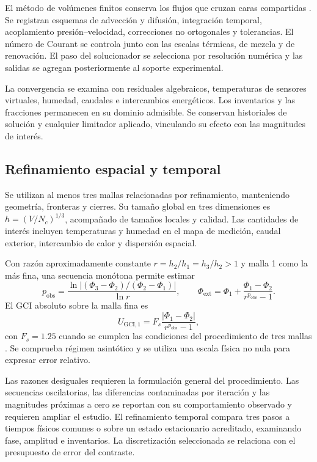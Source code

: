 El método de volúmenes finitos conserva los flujos que cruzan caras compartidas \cite{patankar1980,versteeg2007}. Se registran esquemas de advección y difusión, integración temporal, acoplamiento presión--velocidad, correcciones no ortogonales y tolerancias. El número de Courant se controla junto con las escalas térmicas, de mezcla y de renovación. El paso del solucionador se selecciona por resolución numérica y las salidas se agregan posteriormente al soporte experimental.

La convergencia se examina con residuales algebraicos, temperaturas de sensores virtuales, humedad, caudales e intercambios energéticos. Los inventarios y las fracciones permanecen en su dominio admisible. Se conservan historiales de solución y cualquier limitador aplicado, vinculando su efecto con las magnitudes de interés.

\subsection{Refinamiento espacial y temporal}
\label{met:refinamiento}

Se utilizan al menos tres mallas relacionadas por refinamiento, manteniendo geometría, fronteras y cierres. Su tamaño global en tres dimensiones es $h=(V/N_c)^{1/3}$, acompañado de tamaños locales y calidad. Las cantidades de interés incluyen temperaturas y humedad en el mapa de medición, caudal exterior, intercambio de calor y dispersión espacial.

Con razón aproximadamente constante $r=h_2/h_1=h_3/h_2>1$ y malla 1 como la más fina, una secuencia monótona permite estimar
\begin{equation}
p_{\mathrm{obs}}=\frac{\ln| (\Phi_3-\Phi_2)/(\Phi_2-\Phi_1)|}{\ln r},\qquad
\Phi_{\mathrm{ext}}=\Phi_1+\frac{\Phi_1-\Phi_2}{r^{p_{\mathrm{obs}}}-1}.
\label{met:richardson}
\end{equation}
El GCI absoluto sobre la malla fina es
\begin{equation}
U_{\mathrm{GCI},1}=F_s\frac{|\Phi_1-\Phi_2|}{r^{p_{\mathrm{obs}}}-1},
\label{met:gci}
\end{equation}
con $F_s=1.25$ cuando se cumplen las condiciones del procedimiento de tres mallas \cite{celik2008}. Se comprueba régimen asintótico y se utiliza una escala física no nula para expresar error relativo.

Las razones desiguales requieren la formulación general del procedimiento. Las secuencias oscilatorias, las diferencias contaminadas por iteración y las magnitudes próximas a cero se reportan con su comportamiento observado y requieren ampliar el estudio. El refinamiento temporal compara tres pasos a tiempos físicos comunes o sobre un estado estacionario acreditado, examinando fase, amplitud e inventarios. La discretización seleccionada se relaciona con el presupuesto de error del contraste.
\FloatBarrier

